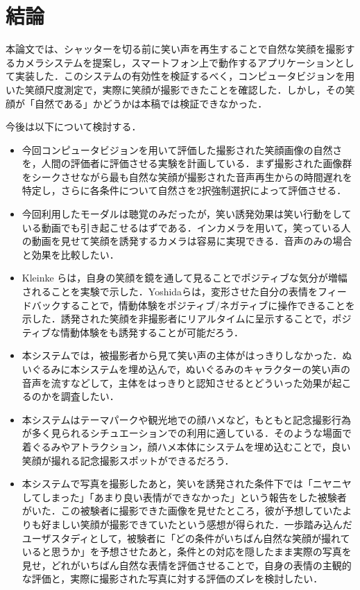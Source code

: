 \documentclass[submit,techreq]{ec2014}
\begin{document}
\section{結論}

本論文では、シャッターを切る前に笑い声を再生することで自然な笑顔を撮影するカメラシステムを提案し，スマートフォン上で動作するアプリケーションとして実装した．このシステムの有効性を検証するべく，コンピュータビジョンを用いた笑顔尺度測定で，実際に笑顔が撮影できたことを確認した．しかし，その笑顔が「自然である」かどうかは本稿では検証できなかった．

今後は以下について検討する．

\begin{itemize}
\item 今回コンピュータビジョンを用いて評価した撮影された笑顔画像の自然さを，人間の評価者に評価させる実験を計画している．まず撮影された画像群をシークさせながら最も自然な笑顔が撮影された音声再生からの時間遅れを特定し，さらに各条件について自然さを2択強制選択によって評価させる．
\item 今回利用したモーダルは聴覚のみだったが，笑い誘発効果は笑い行動をしている動画でも引き起こせるはずである．インカメラを用いて，笑っている人の動画を見せて笑顔を誘発するカメラは容易に実現できる．音声のみの場合と効果を比較したい．
\item Kleinke らは，自身の笑顔を鏡を通して見ることでポジティブな気分が増幅されることを実験で示した\cite{kleinke1998effects}．Yoshidaらは，変形させた自分の表情をフィードバックすることで，情動体験をポジティブ/ネガティブに操作できることを示した．誘発された笑顔を非撮影者にリアルタイムに呈示することで，ポジティブな情動体験をも誘発することが可能だろう．
\item 本システムでは，被撮影者から見て笑い声の主体がはっきりしなかった．ぬいぐるみに本システムを埋め込んで，ぬいぐるみのキャラクターの笑い声の音声を流すなどして，主体をはっきりと認知させるとどういった効果が起こるのかを調査したい．
\item 本システムはテーマパークや観光地での顔ハメなど，もともと記念撮影行為が多く見られるシチュエーションでの利用に適している．そのような場面で着ぐるみやアトラクション，顔ハメ本体にシステムを埋め込むことで，良い笑顔が撮れる記念撮影スポットができるだろう．
\item 本システムで写真を撮影したあと，笑いを誘発された条件下では「ニヤニヤしてしまった」「あまり良い表情ができなかった」という報告をした被験者がいた．この被験者に撮影できた画像を見せたところ，彼が予想していたよりも好ましい笑顔が撮影できていたという感想が得られた．一歩踏み込んだユーザスタディとして，被験者に「どの条件がいちばん自然な笑顔が撮れていると思うか」を予想させたあと，条件との対応を隠したまま実際の写真を見せ，どれがいちばん自然な表情を評価させることで，自身の表情の主観的な評価と，実際に撮影された写真に対する評価のズレを検討したい．
\end{itemize}
\end{document}
